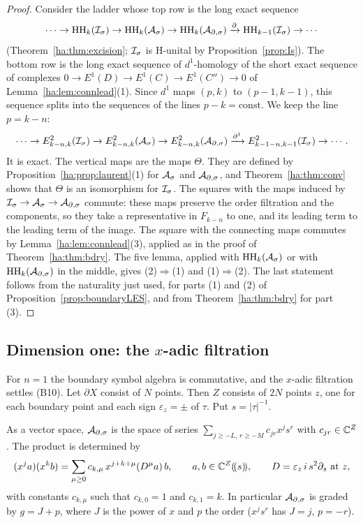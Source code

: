 \begin{proof}
Consider the ladder whose top row is the long exact sequence
\[
 \cdots\to\operatorname{HH}_k(\mathcal I_\sigma)\to\operatorname{HH}_k(\mathcal A_\sigma)\to\operatorname{HH}_k(\mathcal A_{\partial,\sigma})\xrightarrow{\partial}
 \operatorname{HH}_{k-1}(\mathcal I_\sigma)\to\cdots
\]
(Theorem~\ref{ha:thm:excision}; \(\mathcal I_\sigma\) is H-unital by
Proposition~\ref{prop:Is}). The bottom row is the long exact sequence of
\(d^1\)-homology of the short exact sequence of complexes
\(0\to E^1(D)\to E^1(C)\to E^1(C'')\to0\) of
Lemma~\ref{ha:lem:connlead}(1). Since \(d^1\) maps \((p,k)\) to
\((p-1,k-1)\), this sequence splits into the sequences of the lines
\(p-k=\mathrm{const}\). We keep the line \(p=k-n\):
\[
 \cdots\to E^2_{k-n,k}(\mathcal I_\sigma)\to E^2_{k-n,k}(\mathcal A_\sigma)\to E^2_{k-n,k}(\mathcal A_{\partial,\sigma})
 \xrightarrow{\partial^1}E^2_{k-1-n,k-1}(\mathcal I_\sigma)\to\cdots .
\]
It is exact. The vertical maps are the maps \(\Theta\). They are defined
by Proposition~\ref{ha:prop:laurent}(1) for \(\mathcal A_\sigma\) and \(\Ads\), and
Theorem~\ref{ha:thm:conv} shows that \(\Theta\) is an isomorphism for
\(\mathcal I_\sigma\). The squares with the maps induced by \(\mathcal I_\sigma\to\mathcal A_\sigma\to\mathcal A_{\partial,\sigma}\)
commute: these maps preserve the order filtration and the components, so
they take a representative in \(F_{k-n}\) to one, and its leading term to
the leading term of the image. The square with the connecting maps
commutes by Lemma~\ref{ha:lem:connlead}(3), applied as in the proof of
Theorem~\ref{ha:thm:bdry}. The five lemma, applied with \(\operatorname{HH}_k(\mathcal A_\sigma)\) or
with \(\operatorname{HH}_k(\mathcal A_{\partial,\sigma})\) in the middle, gives (2)\(\Rightarrow\)(1) and
(1)\(\Rightarrow\)(2). The last statement follows from the
naturality just used, for parts (1) and (2) of
Proposition~\ref{prop:boundaryLES}, and from Theorem~\ref{ha:thm:bdry}
for part (3).
\end{proof}

\subsection{Dimension one: the \texorpdfstring{\(x\)}{x}-adic filtration}
\label{ha:subsec:xadic}

For \(n=1\) the boundary symbol algebra is commutative, and the
\(x\)-adic filtration settles (B10). Let \(\partial X\) consist of \(N\)
points. Then \(Z\) consists of \(2N\) points \(z\), one for each boundary
point and each sign \(\varepsilon_z=\pm\) of \(\tau\). Put \(s=|\tau|^{-1}\).

\begin{lemma}[\(\Ads\) for \(n=1\)]\label{ha:lem:n1alg}
As a vector space, \(\Ads\) is the space of series \(\sum_{j\ge-L,\,r\ge
-M}c_{jr}x^js^r\) with \(c_{jr}\in\mathbb C^Z\). The product is determined by
\[
 (x^ja)(x^kb)=\sum_{\mu\ge0}c_{k,\mu}\,x^{j+k+\mu}(D^\mu a)\,b,\qquad
 a,b\in\mathbb C^Z(\!(s)\!),\qquad D=\varepsilon_z\,i\,s^2\partial_s\ \text{at }z,
\]
with constants \(c_{k,\mu}\) such that \(c_{k,0}=1\) and \(c_{k,1}=k\).
In particular \(\Ads\) is graded by \(g=J+p\), where \(J\) is the power
of \(x\) and \(p\) the order (\(x^js^r\) has \(J=j\), \(p=-r\)).
\end{lemma}

